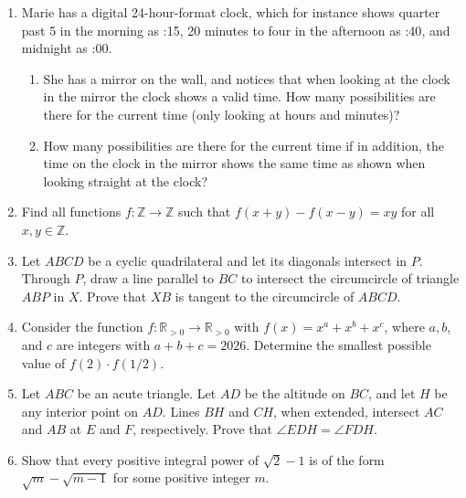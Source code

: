 \documentclass[12pt]{article}
\begin{document}
\begin{enumerate}[topsep=\bigskipamount,itemsep=\bigskipamount,leftmargin=0pt]

\item %
Marie has a digital 24-hour-format clock, which for instance shows quarter past 5 in the morning as {\large {}:15}, 20 minutes to four in the afternoon as {\large {}:40}, and midnight as {\large {}:00}.
\begin{enumerate}
  \item She has a mirror on the wall, and notices that when looking at the clock in the mirror the clock shows a valid time.
  How many possibilities are there for the current time (only looking at hours and minutes)?
  \item How many possibilities are there for the current time if in addition, the time on the clock in the mirror shows the same time as shown when looking straight at the clock?
\end{enumerate}

\item %
Find all functions $f : \mathbb{Z} \to \mathbb{Z}$ such that $f(x + y) - f(x - y) = xy$ for all $x, y \in \mathbb{Z}$.

\item %
Let $ABCD$ be a cyclic quadrilateral and let its diagonals intersect in $P$.
Through $P$, draw a line parallel to $BC$ to intersect the circumcircle of triangle $ABP$ in $X$.
Prove that $XB$ is tangent to the circumcircle  of $ABCD$. 

\item %
Consider the function $f:\mathbb{R}_{>0} \to \mathbb{R}_{>0}$ with $f(x) = x^a + x^b +x^c$, where $a, b$, and $c$ are integers with $a+b+c = 2026$.
Determine the smallest possible value of $f(2)\cdot f(1/2)$.

\item %
Let $ABC$ be an acute triangle.
Let $AD$ be the altitude on $BC$, and let $H$ be any interior point on $AD$.
Lines $BH$ and $CH$, when extended, intersect $AC$ and $AB$ at $E$ and $F$, respectively.
Prove that $\angle EDH = \angle FDH$. 

\item %
Show that every positive integral power of $\sqrt2 - 1$ is of the form $\sqrt{m}-\sqrt{m-1}$ for some positive integer $m$.

\end{enumerate}
\end{document}

